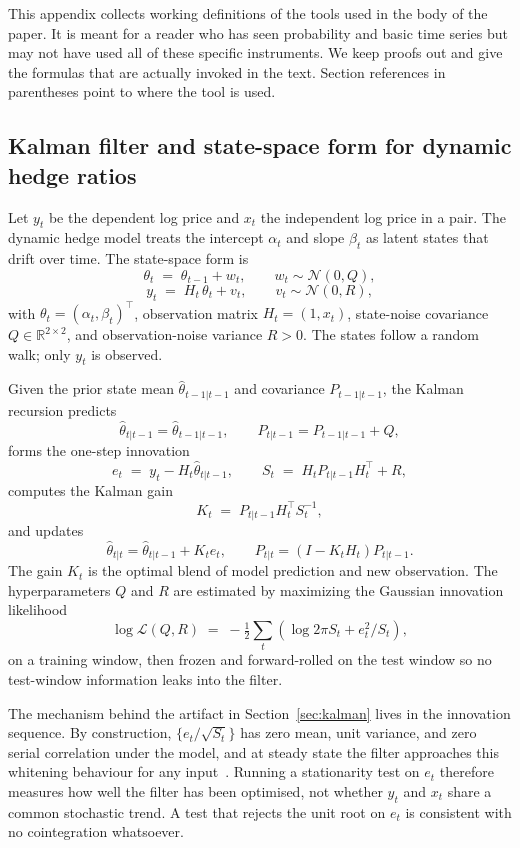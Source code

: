\documentclass[11pt]{article}
\begin{document}
This appendix collects working definitions of the tools used in the body of the paper. It
is meant for a reader who has seen probability and basic time series but may not have used
all of these specific instruments. We keep proofs out and give the formulas that are
actually invoked in the text. Section references in parentheses point to where the tool is
used.

\subsection{Kalman filter and state-space form for dynamic hedge ratios}
\label{app:kalman}

Let $y_t$ be the dependent log price and $x_t$ the independent log price in a pair. The
dynamic hedge model treats the intercept $\alpha_t$ and slope $\beta_t$ as latent states
that drift over time. The state-space form is
\[
\theta_t \;=\; \theta_{t-1} + w_t, \qquad w_t \sim \mathcal{N}(0, Q),
\]
\[
y_t \;=\; H_t \, \theta_t + v_t, \qquad v_t \sim \mathcal{N}(0, R),
\]
with $\theta_t = (\alpha_t, \beta_t)^\top$, observation matrix $H_t = (1, x_t)$, state-noise
covariance $Q \in \mathbb{R}^{2\times 2}$, and observation-noise variance $R > 0$. The
states follow a random walk; only $y_t$ is observed.

Given the prior state mean $\hat{\theta}_{t-1|t-1}$ and covariance $P_{t-1|t-1}$, the
Kalman recursion predicts
\[
\hat{\theta}_{t|t-1} = \hat{\theta}_{t-1|t-1}, \qquad P_{t|t-1} = P_{t-1|t-1} + Q,
\]
forms the one-step innovation
\[
e_t \;=\; y_t - H_t \hat{\theta}_{t|t-1}, \qquad S_t \;=\; H_t P_{t|t-1} H_t^\top + R,
\]
computes the Kalman gain
\[
K_t \;=\; P_{t|t-1} H_t^\top S_t^{-1},
\]
and updates
\[
\hat{\theta}_{t|t} = \hat{\theta}_{t|t-1} + K_t e_t, \qquad P_{t|t} = (I - K_t H_t) P_{t|t-1}.
\]
The gain $K_t$ is the optimal blend of model prediction and new observation. The
hyperparameters $Q$ and $R$ are estimated by maximizing the Gaussian innovation likelihood
\[
\log \mathcal{L}(Q, R) \;=\; -\tfrac{1}{2} \sum_{t} \left( \log 2\pi S_t + e_t^2 / S_t \right),
\]
on a training window, then frozen and forward-rolled on the test window so no test-window
information leaks into the filter.

The mechanism behind the artifact in Section~\ref{sec:kalman} lives in the innovation
sequence. By construction, $\{e_t / \sqrt{S_t}\}$ has zero mean, unit variance, and zero
serial correlation under the model, and at steady state the filter approaches this
whitening behaviour for any input~\cite{harvey1989structural}. Running a stationarity test
on $e_t$ therefore measures how well the filter has been optimised, not whether $y_t$ and
$x_t$ share a common stochastic trend. A test that rejects the unit root on $e_t$ is
consistent with no cointegration whatsoever.
\end{document}
